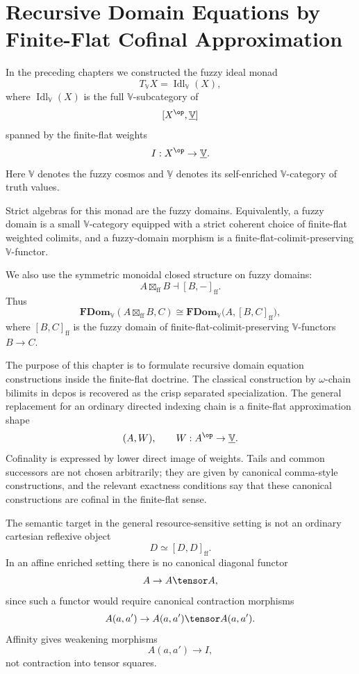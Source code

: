 \chapter{Recursive Domain Equations by Finite-Flat Cofinal Approximation}
\label{ch:recursive-domain-equations-finite-flat}

In the preceding chapters we constructed the fuzzy ideal monad
\[
    T_{\mathbb V}X
    =
    \operatorname{Idl}_{\mathbb V}(X),
\]
where \(\operatorname{Idl}_{\mathbb V}(X)\) is the full
\(\mathbb V\)-subcategory of
\[
    [X^{\op},\underline{\mathbb V}]
\]
spanned by the finite-flat weights
\[
    I:X^{\op}\to\underline{\mathbb V}.
\]
Here \(\mathbb V\) denotes the fuzzy cosmos and
\(\underline{\mathbb V}\) denotes its self-enriched
\(\mathbb V\)-category of truth values.

Strict algebras for this monad are the fuzzy domains.  Equivalently, a fuzzy
domain is a small \(\mathbb V\)-category equipped with a strict coherent choice
of finite-flat weighted colimits, and a fuzzy-domain morphism is a
finite-flat-colimit-preserving \(\mathbb V\)-functor.

We also use the symmetric monoidal closed structure on fuzzy domains:
\[
    A\boxtimes_{\mathrm{ff}}B
    \dashv
    [B,-]_{\mathrm{ff}}.
\]
Thus
\[
    \mathbf{FDom}_{\mathbb V}
    (A\boxtimes_{\mathrm{ff}}B,C)
    \cong
    \mathbf{FDom}_{\mathbb V}
    \bigl(A,[B,C]_{\mathrm{ff}}\bigr),
\]
where \([B,C]_{\mathrm{ff}}\) is the fuzzy domain of
finite-flat-colimit-preserving \(\mathbb V\)-functors \(B\to C\).

The purpose of this chapter is to formulate recursive domain equation
constructions inside the finite-flat doctrine.  The classical construction by
\(\omega\)-chain bilimits in dcpos is recovered as the crisp separated
specialization.  The general replacement for an ordinary directed indexing
chain is a finite-flat approximation shape
\[
    (A,W),
    \qquad
    W:A^{\op}\to\underline{\mathbb V}.
\]
Cofinality is expressed by lower direct image of weights.  Tails and common
successors are not chosen arbitrarily; they are given by canonical
comma-style constructions, and the relevant exactness conditions say that
these canonical constructions are cofinal in the finite-flat sense.

The semantic target in the general resource-sensitive setting is not an
ordinary cartesian reflexive object
\[
    D\simeq [D,D]_{\mathrm{ff}}.
\]
In an affine enriched setting there is no canonical diagonal functor
\[
    A\to A\tensor A,
\]
since such a functor would require canonical contraction morphisms
\[
    A(a,a')\to A(a,a')\tensor A(a,a').
\]
Affinity gives weakening morphisms
\[
    A(a,a')\to I,
\]
not contraction into tensor squares.

